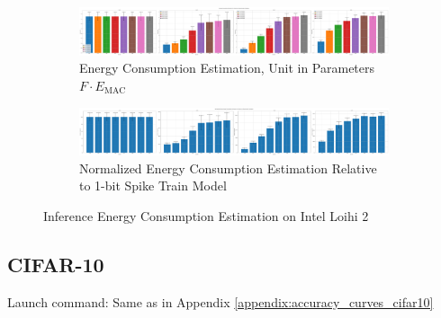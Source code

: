         \begin{figure}[H]
            \centering
            \begin{subfigure}[H]{\textwidth}
                \includegraphics[width=\textwidth]{../standard/DVSGesture/plots/dvsgesture_test_energy_nh.pdf}
                \caption{Energy Consumption Estimation, Unit in Parameters $F\cdot E_{\text{MAC}}$}
            \end{subfigure}
            \hfill
            \begin{subfigure}[H]{\textwidth}
                \includegraphics[width=\textwidth]{../standard/DVSGesture/plots/dvsgesture_test_relative_energy_nh.pdf}
                \caption{Normalized Energy Consumption Estimation Relative to 1-bit Spike Train Model}
            \end{subfigure}
            \caption{Inference Energy Consumption Estimation on Intel Loihi 2}
        \end{figure}

    \subsection{CIFAR-10}
    \label{appendix:energy_neuromorphic_cifar10}
        Launch command: Same as in Appendix \ref{appendix:accuracy_curves_cifar10}

